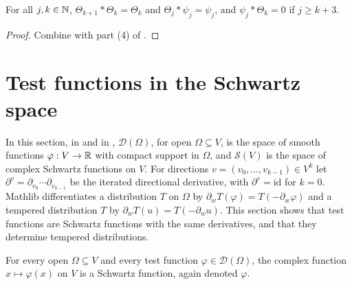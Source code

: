 \begin{theorem}
\label{thm:kernel-identities}
\leanok
{}
For all $j, k \in \mathbb{N}$, $\Theta_{k+1} * \Theta_k = \Theta_k$ and $\Theta_j * \psi_j = \psi_j$,
and $\psi_j * \Theta_k = 0$ if $j \geq k + 3$.
\end{theorem}

\begin{proof}
\leanok
Combine  with part (4) of .
\end{proof}

\section{Test functions in the Schwartz space}
\label{sec:schwartz-cutoff}

In this section, in  and in ,
$\mathcal D(\Omega)$, for open $\Omega \subseteq V$, is the space of smooth functions
$\varphi : V \to \mathbb{R}$ with compact support in $\Omega$, and $\mathcal S(V)$ is the space of
complex Schwartz functions on $V$. For directions $v = (v_0, \dots, v_{k-1}) \in V^k$ let
$\partial^v = \partial_{v_0} \cdots \partial_{v_{k-1}}$ be the iterated directional derivative,
with $\partial^v = \mathrm{id}$ for $k = 0$. Mathlib
differentiates a distribution $T$ on $\Omega$ by $\partial_w T(\varphi) = T(-\partial_w \varphi)$
and a tempered distribution $T$ by $\partial_w T(u) = T(-\partial_w u)$. This section shows that
test functions are Schwartz functions with the same derivatives, and that they determine
tempered distributions.

\begin{definition}
\label{def:test-schwartz}
\leanok
For every open $\Omega \subseteq V$ and every test function $\varphi \in \mathcal D(\Omega)$,
the complex function
$x \mapsto \varphi(x)$ on $V$ is a Schwartz function, again denoted $\varphi$.
\end{definition}

